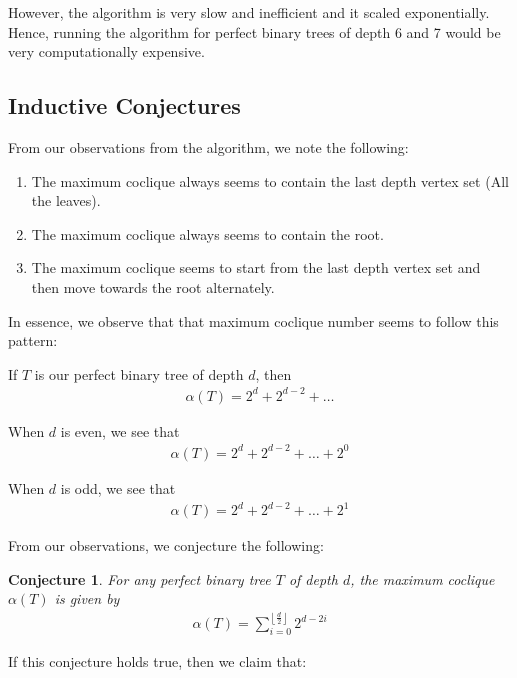 \documentclass[11pt,a4paper]{article}
\newtheorem{conjecture}[theorem]{Conjecture}
\theoremstyle{definition}
\begin{document}
However, the algorithm is very slow and inefficient and it scaled exponentially. Hence, running the algorithm for perfect binary trees of depth 6 and 7 would be very computationally expensive.

\newpage

\subsection{Inductive Conjectures}

From our observations from the algorithm, we note the following:

\begin{enumerate}
	\item The maximum coclique always seems to contain the last depth vertex set (All the leaves).
	\item The maximum coclique always seems to contain the root.
	\item The maximum coclique seems to start from the last depth vertex set and then move towards the root alternately.
\end{enumerate}

In essence, we observe that that maximum coclique number seems to follow this pattern:

If $T$ is our perfect binary tree of depth $d$, then
\begin{align*}
	\alpha(T) = 2^d + 2^{d-2} + \ldots
\end{align*}

When $d$ is even, we see that
\begin{align*}
	\alpha(T) = 2^d + 2^{d-2} + \ldots + 2^0
\end{align*}

When $d$ is odd, we see that
\begin{align*}
	\alpha(T) = 2^d + 2^{d-2} + \ldots + 2^1
\end{align*}

From our observations, we conjecture the following:

\begin{conjecture}
	For any perfect binary tree $T$ of depth $d$, the maximum coclique $\alpha(T)$ is given by
	\begin{align*}
		\alpha(T) = \sum_{i= 0}^{\left\lfloor\frac{d}{2}\right\rfloor} 2^{d - 2i}
	\end{align*}
\end{conjecture}

If this conjecture holds true, then we claim that:
\end{document}
